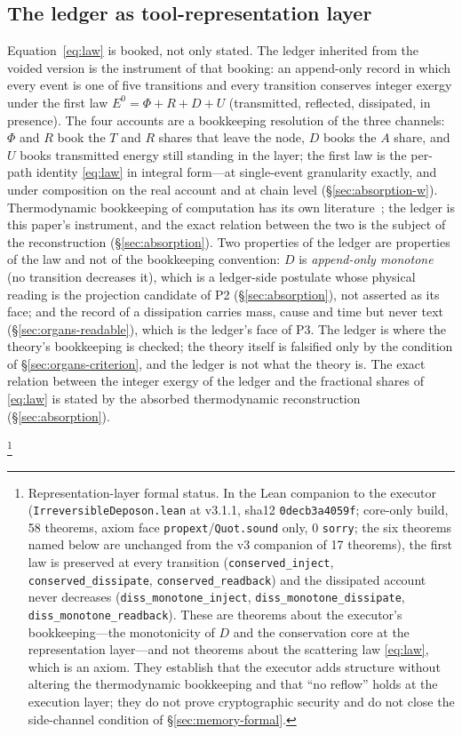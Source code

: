 \documentclass[11pt,a4paper]{article}
\newcommand{\Ezero}{E^{0}}
\newcommand{\thm}[1]{\nolinkurl{#1}}
\begin{document}
\subsection{The ledger as tool-representation layer}
\label{sec:framework-ledger}

Equation~\eqref{eq:law} is booked, not only stated. The ledger inherited from the voided version is the instrument of that booking: an append-only record in which every event is one of five transitions and every transition conserves integer exergy under the first law $\Ezero = \Phi + R + D + U$ (transmitted, reflected, dissipated, in presence). The four accounts are a bookkeeping resolution of the three channels: $\Phi$ and $R$ book the $T$ and $R$ shares that leave the node, $D$ books the $A$ share, and $U$ books transmitted energy still standing in the layer; the first law is the per-path identity \eqref{eq:law} in integral form---at single-event granularity exactly, and under composition on the real account and at chain level (\S\ref{sec:absorption-w}). Thermodynamic bookkeeping of computation has its own literature~\cite{landauer1961,bennett1982,still2012,still2020}; the ledger is this paper's instrument, and the exact relation between the two is the subject of the reconstruction (\S\ref{sec:absorption}). Two properties of the ledger are properties of the law and not of the bookkeeping convention: $D$ is \emph{append-only monotone} (no transition decreases it), which is a ledger-side postulate whose physical reading is the projection candidate of P2 (\S\ref{sec:absorption}), not asserted as its face; and the record of a dissipation carries mass, cause and time but never text (\S\ref{sec:organs-readable}), which is the ledger's face of P3. The ledger is where the theory's bookkeeping is checked; the theory itself is falsified only by the condition of \S\ref{sec:organs-criterion}, and the ledger is not what the theory is. The exact relation between the integer exergy of the ledger and the fractional shares of \eqref{eq:law} is stated by the absorbed thermodynamic reconstruction (\S\ref{sec:absorption}).

\footnote{Representation-layer formal status. In the Lean companion to the executor (\texttt{IrreversibleDeposon.lean} at v3.1.1, sha12 \texttt{0decb3a4059f}; core-only build, 58 theorems, axiom face \texttt{propext}/\texttt{Quot.sound} only, 0 \texttt{sorry}; the six theorems named below are unchanged from the v3 companion of 17 theorems), the first law is preserved at every transition (\thm{conserved_inject}, \thm{conserved_dissipate}, \thm{conserved_readback}) and the dissipated account never decreases (\thm{diss_monotone_inject}, \thm{diss_monotone_dissipate}, \thm{diss_monotone_readback}). These are theorems about the executor's bookkeeping---the monotonicity of $D$ and the conservation core at the representation layer---and not theorems about the scattering law \eqref{eq:law}, which is an axiom. They establish that the executor adds structure without altering the thermodynamic bookkeeping and that ``no reflow'' holds at the execution layer; they do not prove cryptographic security and do not close the side-channel condition of \S\ref{sec:memory-formal}.}
\end{document}
